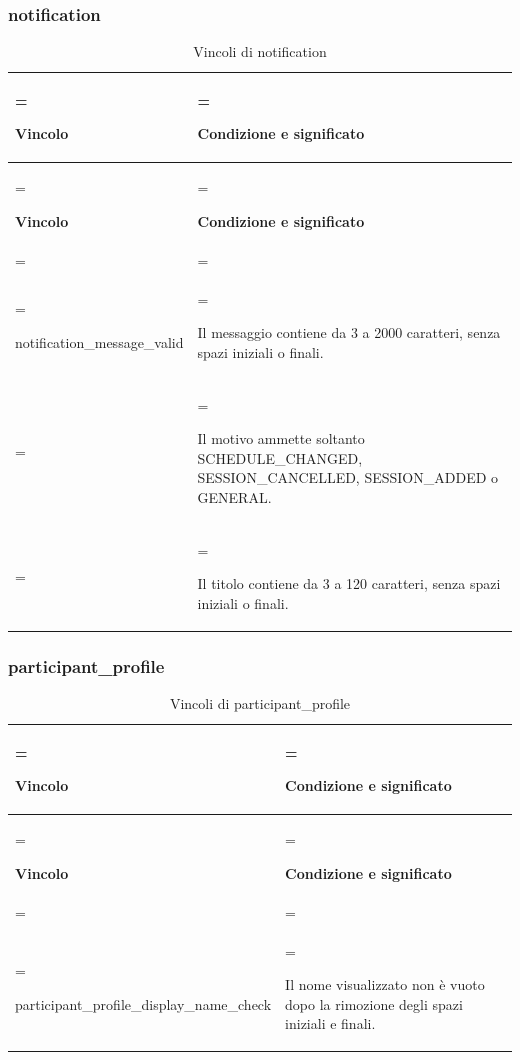 \documentclass[11pt,a4paper]{article}
\begin{document}
\subsubsection{notification}
{\small\renewcommand{\arraystretch}{1.25}
\begin{xltabular}{\linewidth}{>{\hsize\linewidth=\hsize\raggedright\arraybackslash}X>{\hsize\linewidth=\hsize\raggedright\arraybackslash}X}
\caption{Vincoli di notification}\label{tab:dictionary-37}\\
\toprule
\textbf{Vincolo} & \textbf{Condizione e significato}\\\midrule\endfirsthead\toprule\textbf{Vincolo} & \textbf{Condizione e significato}\\\midrule\endhead
\midrule{}\\\endfoot\bottomrule\endlastfoot

{\ttfamily\small notification\_\allowbreak{}message\_\allowbreak{}valid} & Il messaggio contiene da 3 a 2000 caratteri, senza spazi iniziali o finali.\\ & Il motivo ammette soltanto SCHEDULE\_CHANGED, SESSION\_CANCELLED, SESSION\_ADDED o GENERAL.\\ & Il titolo contiene da 3 a 120 caratteri, senza spazi iniziali o finali.\\*
\end{xltabular}}

\subsubsection{participant\_profile}
{\small\renewcommand{\arraystretch}{1.25}
\begin{xltabular}{\linewidth}{>{\hsize\linewidth=\hsize\raggedright\arraybackslash}X>{\hsize\linewidth=\hsize\raggedright\arraybackslash}X}
\caption{Vincoli di participant\_profile}\label{tab:dictionary-38}\\
\toprule
\textbf{Vincolo} & \textbf{Condizione e significato}\\\midrule\endfirsthead\toprule\textbf{Vincolo} & \textbf{Condizione e significato}\\\midrule\endhead
\midrule{}\\\endfoot\bottomrule\endlastfoot

{\ttfamily\small participant\_\allowbreak{}profile\_\allowbreak{}display\_\allowbreak{}name\_\allowbreak{}check} & Il nome visualizzato non è vuoto dopo la rimozione degli spazi iniziali e finali.\\*
\end{xltabular}}
\end{document}
